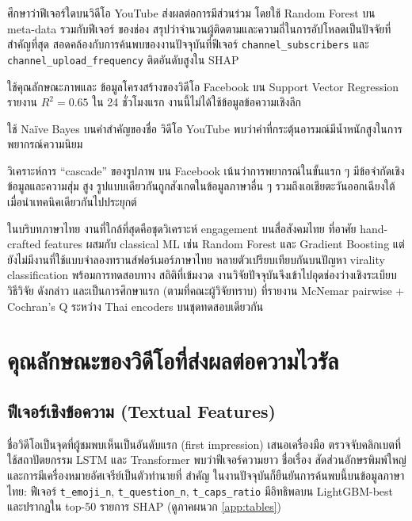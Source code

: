 \textbf{\textcite{hoiles2017engagement}} ศึกษาว่าฟีเจอร์ใดบนวิดีโอ
YouTube ส่งผลต่อการมีส่วนร่วม โดยใช้ Random Forest บน meta-data รวมกับฟีเจอร์
ของช่อง สรุปว่าจำนวนผู้ติดตามและความถี่ในการอัปโหลดเป็นปัจจัยที่สำคัญที่สุด
สอดคล้องกับการค้นพบของงานปัจจุบันที่ฟีเจอร์ \texttt{channel\_subscribers}
และ \texttt{channel\_upload\_frequency} ติดอันดับสูงใน SHAP

\textbf{\textcite{trzcinski2017popularity}} ใช้คุณลักษณะภาพและ
ข้อมูลโครงสร้างของวิดีโอ Facebook บน Support Vector Regression รายงาน
$R^2 = 0.65$ ใน 24 ชั่วโมงแรก งานนี้ไม่ได้ใช้ข้อมูลข้อความเชิงลึก

\textbf{\textcite{lee2010approach}} ใช้ Naïve Bayes บนคำสำคัญของชื่อ
วิดีโอ YouTube พบว่าคำที่กระตุ้นอารมณ์มีน้ำหนักสูงในการพยากรณ์ความนิยม

\textbf{\textcite{cheng2014can}} วิเคราะห์การ ``cascade'' ของรูปภาพ
บน Facebook เน้นว่าการพยากรณ์ในขั้นแรก ๆ มีข้อจำกัดเชิงข้อมูลและความสุ่ม
สูง รูปแบบเดียวกันถูกสังเกตในข้อมูลภาษาอื่น ๆ รวมถึงเอเชียตะวันออกเฉียงใต้
เมื่อนำเทคนิคเดียวกันไปประยุกต์

ในบริบทภาษาไทย งานที่ใกล้ที่สุดคือชุดวิเคราะห์ engagement บนสื่อสังคมไทย
ที่อาศัย hand-crafted features ผสมกับ classical ML เช่น Random Forest และ
Gradient Boosting แต่ยังไม่มีงานที่ใช้แบบจำลองทรานส์ฟอร์เมอร์ภาษาไทย
หลายตัวเปรียบเทียบกันบนปัญหา virality classification พร้อมการทดสอบทาง
สถิติที่เข้มงวด งานวิจัยปัจจุบันจึงเข้าไปอุดช่องว่างเชิงระเบียบวิธีวิจัย
ดังกล่าว และเป็นการศึกษาแรก (ตามที่คณะผู้วิจัยทราบ) ที่รายงาน McNemar
pairwise + Cochran's Q ระหว่าง Thai encoders บนชุดทดสอบเดียวกัน

\section{คุณลักษณะของวิดีโอที่ส่งผลต่อความไวรัล}
\label{sec:lit-features}

\subsection{ฟีเจอร์เชิงข้อความ (Textual Features)}

ชื่อวิดีโอเป็นจุดที่ผู้ชมพบเห็นเป็นอันดับแรก (first impression)
\textcite{potthast2018clickbait} เสนอเครื่องมือ
ตรวจจับคลิกเบตที่ใช้สถาปัตยกรรม LSTM และ Transformer พบว่าฟีเจอร์ความยาว
ชื่อเรื่อง สัดส่วนอักษรพิมพ์ใหญ่ และการมีเครื่องหมายอัศเจรีย์เป็นตัวทำนายที่
สำคัญ ในงานปัจจุบันก็ยืนยันการค้นพบนี้บนข้อมูลภาษาไทย: ฟีเจอร์ \texttt{t\_emoji\_n},
\texttt{t\_question\_n}, \texttt{t\_caps\_ratio} มีอิทธิพลบน LightGBM-best
และปรากฏใน top-50 รายการ SHAP (ดูภาคผนวก \ref{app:tables})

